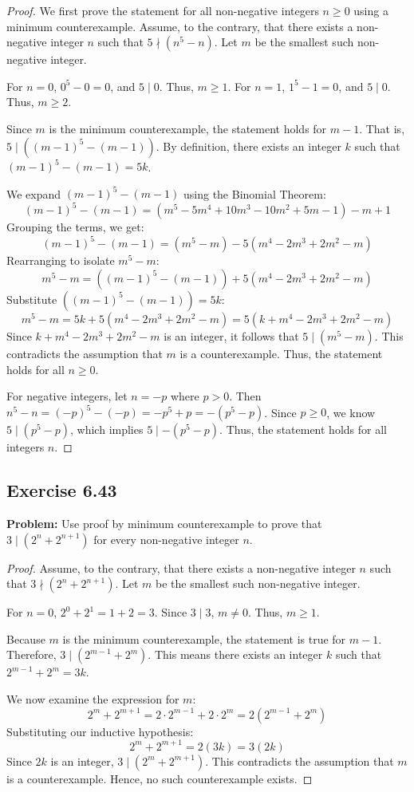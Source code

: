 \documentclass[11pt, a4paper]{article}
\theoremstyle{definition}
\theoremstyle{remark}
\begin{document}
\begin{proof}
We first prove the statement for all non-negative integers $n \ge 0$ using a minimum counterexample. Assume, to the contrary, that there exists a non-negative integer $n$ such that $5 \nmid (n^5 - n)$. Let $m$ be the smallest such non-negative integer.

For $n=0$, $0^5 - 0 = 0$, and $5 \mid 0$. Thus, $m \ge 1$.
For $n=1$, $1^5 - 1 = 0$, and $5 \mid 0$. Thus, $m \ge 2$.

Since $m$ is the minimum counterexample, the statement holds for $m-1$. That is, $5 \mid ((m-1)^5 - (m-1))$. By definition, there exists an integer $k$ such that $(m-1)^5 - (m-1) = 5k$.

We expand $(m-1)^5 - (m-1)$ using the Binomial Theorem:
\[
(m-1)^5 - (m-1) = (m^5 - 5m^4 + 10m^3 - 10m^2 + 5m - 1) - m + 1
\]
Grouping the terms, we get:
\[
(m-1)^5 - (m-1) = (m^5 - m) - 5(m^4 - 2m^3 + 2m^2 - m)
\]
Rearranging to isolate $m^5 - m$:
\[
m^5 - m = ((m-1)^5 - (m-1)) + 5(m^4 - 2m^3 + 2m^2 - m)
\]
Substitute $((m-1)^5 - (m-1)) = 5k$:
\[
m^5 - m = 5k + 5(m^4 - 2m^3 + 2m^2 - m) = 5 \left( k + m^4 - 2m^3 + 2m^2 - m \right)
\]
Since $k + m^4 - 2m^3 + 2m^2 - m$ is an integer, it follows that $5 \mid (m^5 - m)$. This contradicts the assumption that $m$ is a counterexample. Thus, the statement holds for all $n \ge 0$.

For negative integers, let $n = -p$ where $p > 0$. Then $n^5 - n = (-p)^5 - (-p) = -p^5 + p = -(p^5 - p)$. Since $p \ge 0$, we know $5 \mid (p^5 - p)$, which implies $5 \mid -(p^5 - p)$. Thus, the statement holds for all integers $n$.
\end{proof}

\subsection{Exercise 6.43}
\textbf{Problem:} Use proof by minimum counterexample to prove that $3 \mid (2^n + 2^{n+1})$ for every non-negative integer $n$.

\begin{proof}
Assume, to the contrary, that there exists a non-negative integer $n$ such that $3 \nmid (2^n + 2^{n+1})$. Let $m$ be the smallest such non-negative integer.

For $n=0$, $2^0 + 2^1 = 1 + 2 = 3$. Since $3 \mid 3$, $m \neq 0$. Thus, $m \ge 1$.

Because $m$ is the minimum counterexample, the statement is true for $m-1$. Therefore, $3 \mid (2^{m-1} + 2^m)$. This means there exists an integer $k$ such that $2^{m-1} + 2^m = 3k$.

We now examine the expression for $m$:
\[
2^m + 2^{m+1} = 2 \cdot 2^{m-1} + 2 \cdot 2^m = 2(2^{m-1} + 2^m)
\]
Substituting our inductive hypothesis:
\[
2^m + 2^{m+1} = 2(3k) = 3(2k)
\]
Since $2k$ is an integer, $3 \mid (2^m + 2^{m+1})$. This contradicts the assumption that $m$ is a counterexample. Hence, no such counterexample exists.
\end{proof}
\end{document}
